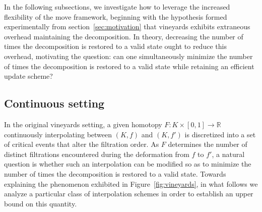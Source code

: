 \documentclass[sn-mathphys]{sn-jnl}
\begin{document}
In the following subsections, we investigate how to  leverage the increased flexibility of the move framework, beginning with the hypothesis formed experimentally from section~\ref{sec:motivation} that vineyards exhibits extraneous overhead maintaining the decomposition.
In theory, decreasing the number of times the decomposition is restored to a valid state ought to reduce this overhead, motivating the question: can one simultaneously minimize the number of times the decomposition is restored to a valid state while retaining an efficient update scheme? 

\subsection{Continuous setting}\label{sec:continuous_setting}
In the original vineyards setting, a given homotopy  $F : K \times [0,1] \to \mathbb{R}$ continuously interpolating between $(K, f)$ and $(K, f')$ is discretized into a set of critical events that alter the filtration order. 
As $F$ determines the number of distinct filtrations encountered during the deformation from $f$ to $f'$, a natural question is whether such an interpolation can be modified so as to minimize the number of times the decomposition is restored to a valid state.
Towards explaining the phenomenon exhibited in Figure~\ref{fig:vineyards}, in what follows we analyze a particular class of interpolation schemes in order to establish an upper bound on this quantity.

\end{document}
